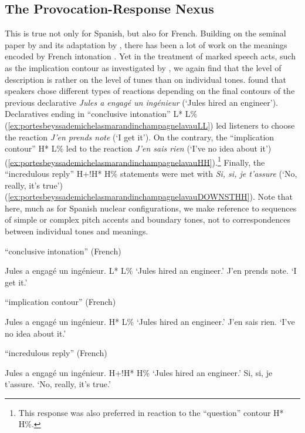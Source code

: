 \subsection{The Provocation-Response Nexus}

This is true not only for Spanish, but also for French. Building on the seminal paper by \citet{PierrehumbertHirschberg1990} and its adaptation by \citet{Steedman.2007}, there has been a lot of work on the meanings encoded by French intonation \citep{BeyssadeMarandin.2009,PortesBeyssade.2012,PortesReyle.2014,PortesBeyssadeMichelasMarandinChampagneLavau.2014,MichelasPortesChampagneLavau.2016}. Yet in the treatment of marked speech acts, such as the implication contour \citep{Delattre1966} as investigated by \citet{PortesBeyssadeMichelasMarandinChampagneLavau.2014}, we again find that the level of description is rather on the level of tunes than on individual tones. \citet{PortesBeyssadeMichelasMarandinChampagneLavau.2014} found that speakers chose different types of reactions depending on the final contours of the previous declarative \textit{Jules a engagé un ingénieur} (`Jules hired an engineer'). Declaratives ending in ``conclusive intonation'' L* L\% (\ref{ex:portesbeyssademichelasmarandinchampagnelavauLL}) led listeners to choose the reaction \textit{J'en prends note} (`I get it'). On the contrary, the ``implication contour'' H* L\% led to the reaction \textit{J'en sais rien} (`I've no idea about it') (\ref{ex:portesbeyssademichelasmarandinchampagnelavauHH}).\footnote{This response was also preferred in reaction to the ``question'' contour H* H\%.} Finally, the ``incredulous reply'' H+!H* H\% statements were met with \textit{Si, si, je t'assure} (`No, really, it's true') (\ref{ex:portesbeyssademichelasmarandinchampagnelavauDOWNSTHH}). Note that here, much as for Spanish nuclear configurations, we make reference to sequences of simple or complex pitch accents and boundary tones, not to correspondences between individual tones and meanings.\largerpage

\begin{exe}
\ex \label{ex:portesbeyssademichelasmarandinchampagnelavauLL} ``conclusive intonation'' (French) 
	\begin{xlist}[A:]
	 Jules a engagé un ingénieur. L* L\% 
	\glt `Jules hired an engineer.' 
	 J'en prends note. 
	\glt `I get it.' 
	\end{xlist}

\ex \label{ex:portesbeyssademichelasmarandinchampagnelavauHH} ``implication contour'' (French)
	\begin{xlist}[A:]
		 Jules a engagé un ingénieur. H* L\% 
		\glt `Jules hired an engineer.' 
		 J'en sais rien. 
		\glt `I've no idea about it.' 
	\end{xlist}

\ex \label{ex:portesbeyssademichelasmarandinchampagnelavauDOWNSTHH} ``incredulous reply'' (French)
	\begin{xlist}[A:]
		 Jules a engagé un ingénieur. H+!H* H\% 
		\glt `Jules hired an engineer.' 
		 Si, si, je t'assure. 
		\glt `No, really, it's true.' 
	\end{xlist}
\end{exe}

